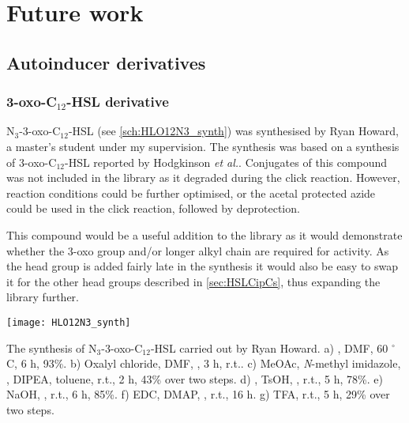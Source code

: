 \section{Future work \label{sec:Fut}}


\subsection{Autoinducer derivatives}

\subsubsection{3-oxo-C$_{12}$-HSL derivative  \label{sec:Fut_HLO12}}

N$_3$-3-oxo-C$_{12}$-HSL  (see \ref{sch:HLO12N3_synth}) was synthesised by Ryan Howard, a master's student under my supervision. The synthesis was based on a synthesis of 3-oxo-C$_{12}$-HSL  reported by Hodgkinson \textit{et al.}\cite{Hodgkinson2011}. 
Conjugates of this compound was not included in the library as it degraded during the click reaction. However, reaction conditions could be further optimised, or the acetal protected azide  could be used in the click reaction, followed by deprotection.

This compound would be a useful addition to the library as it would demonstrate whether the 3-oxo group and/or longer alkyl chain are required for activity. As the head group is added fairly late in the synthesis it would also be easy to swap it for the other head groups described in \ref{sec:HSLCipCs}, thus expanding the library further.

\begin{scheme}[H]
	\begin{center}
		\texttt{[image: HLO12N3\_synth]}
		\caption{The synthesis of N$_3$-3-oxo-C$_{12}$-HSL  carried out by Ryan Howard.
		a) , DMF, 60 $^{\circ}$C, 6 h, 93\%.
		b) Oxalyl chloride, DMF, , 3 h, r.t..
		c) MeOAc, \textit{N}-methyl imidazole, , DIPEA, toluene, r.t., 2 h, 43\% over two steps.
		d) , TsOH, , r.t., 5 h, 78\%.
		e) NaOH, , r.t., 6 h, 85\%.
		f) EDC, DMAP, , r.t., 16 h.
		g) TFA, r.t., 5 h, 29\% over two steps.
		\label{sch:HLO12N3_synth}}
	\end{center}
\end{scheme}

